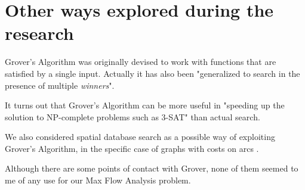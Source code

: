 
\chapter{Other ways explored during the research}
\label{chp:other}

Grover's Algorithm was originally devised to work with functions that are satisfied by a single input. Actually it has also been "generalized to search in the presence of multiple \textit{winners}". \cite{Boyer1998}

\bigskip

It turns out that Grover's Algorithm can be more useful in "speeding up the solution to NP-complete problems such as 3-SAT" than actual search. \cite{montanaro2016quantum}

\bigskip

We also considered spatial database search as a possible way of exploiting Grover's Algorithm, in the specific case of graphs with costs on arcs \cite{Aharonov:2001:QWG:380752.380758, childs2004spatial}.

Although there are some points of contact with Grover, none of them seemed to me of any use for our Max Flow Analysis problem.

